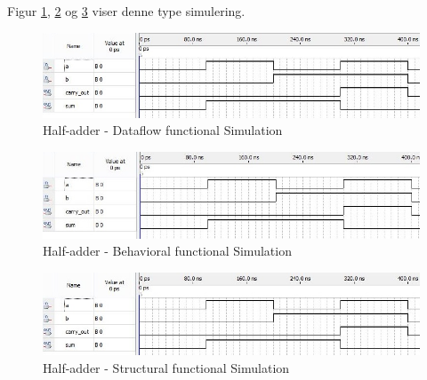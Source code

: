 \begin{enumerate}
	Figur \ref{fig:HaDataflowFunctionalSim}, \ref{fig:HaBehavioralFunctionalSim} og \ref{fig:HaStructuralFunctionalSim} viser denne type simulering.\\
\begin{figure}[h]
	\includegraphics[scale=0.6]{pictures/Oevelse1/Half_adder/Dataflow_functional_simulation.jpg}
	\caption{Half-adder - Dataflow functional Simulation}
	\label{fig:HaDataflowFunctionalSim}
\end{figure}
\begin{figure}[h]
	\includegraphics[scale=0.6]{pictures/Oevelse1/Half_adder/Behavioral_functional_simulation.jpg}
	\caption{Half-adder - Behavioral functional Simulation}
	\label{fig:HaBehavioralFunctionalSim}
\end{figure}
\begin{figure}[h]
	\includegraphics[scale=0.6]{pictures/Oevelse1/Half_adder/Structural_functional_simulation.jpg}
	\caption{Half-adder - Structural functional Simulation}
	\label{fig:HaStructuralFunctionalSim}
\end{figure}
	\newpage
\end{enumerate}